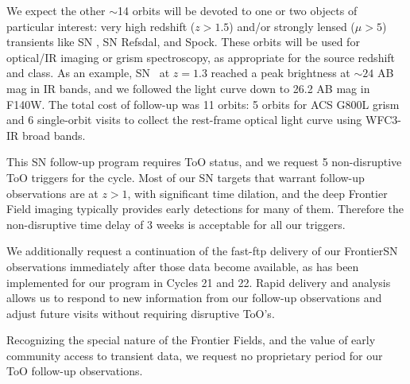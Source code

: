 \documentclass[12pt]{article}
\begin{document}
We expect the other $\sim$14 orbits will be devoted to one or two
objects of particular interest: very high redshift ($z>1.5$) and/or
strongly lensed ($\mu>5$) transients like SN \tomas, SN Refsdal, and
Spock.  These orbits will be used for optical/IR imaging or grism
spectroscopy, as appropriate for the source redshift and class.  As an
example, SN \tomas\ at $z=1.3$ reached a peak brightness at $\sim24$
AB mag in IR bands, and we followed the light curve down to 26.2 AB mag
in F140W.  The total cost of follow-up was 11 orbits: 5 orbits for ACS
G800L grism and 6 single-orbit visits to collect the rest-frame
optical light curve using WFC3-IR broad bands.






%
%
\specialreq             %


This SN follow-up program requires ToO status, and we request 5
non-disruptive ToO triggers for the cycle.  Most of our SN targets
that warrant follow-up observations are at $z>1$, with significant
time dilation, and the deep Frontier Field imaging typically provides
early detections for many of them.  Therefore the non-disruptive time
delay of 3 weeks is acceptable for all our triggers.

We additionally request a continuation of the fast-ftp delivery of our
FrontierSN observations immediately after those data become available,
as has been implemented for our program in Cycles 21 and 22.  Rapid
delivery and analysis allows us to respond to new information from our
follow-up observations and adjust future visits without requiring
disruptive ToO's.

Recognizing the special nature of the Frontier Fields, and the value
of early community access to transient data, we request no proprietary
period for our ToO follow-up observations.


\end{document}
